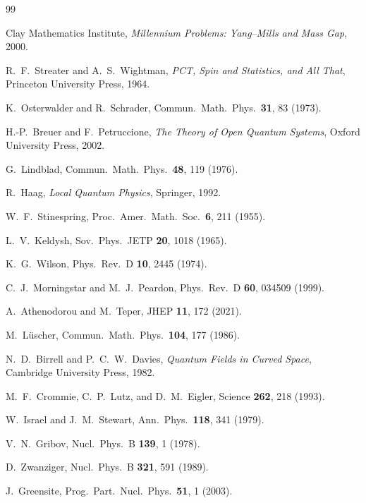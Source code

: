\documentclass[aps,prd,reprint,superscriptaddress,floatfix]{revtex4-2}
\theoremstyle{definition}
\begin{document}
\begin{thebibliography}{99}

  Clay Mathematics Institute, \textit{Millennium Problems: Yang--Mills and
  Mass Gap}, 2000.

  R.~F.~Streater and A.~S.~Wightman,
  \textit{PCT, Spin and Statistics, and All That},
  Princeton University Press, 1964.

  K.~Osterwalder and R.~Schrader,
  Commun.\ Math.\ Phys.\ \textbf{31}, 83 (1973).

  H.-P.~Breuer and F.~Petruccione,
  \textit{The Theory of Open Quantum Systems},
  Oxford University Press, 2002.

  G.~Lindblad,
  Commun.\ Math.\ Phys.\ \textbf{48}, 119 (1976).

  R.~Haag, \textit{Local Quantum Physics}, Springer, 1992.

  W.~F.~Stinespring,
  Proc.\ Amer.\ Math.\ Soc.\ \textbf{6}, 211 (1955).

  L.~V.~Keldysh,
  Sov.\ Phys.\ JETP \textbf{20}, 1018 (1965).

  K.~G.~Wilson,
  Phys.\ Rev.\ D \textbf{10}, 2445 (1974).

  C.~J.~Morningstar and M.~J.~Peardon,
  Phys.\ Rev.\ D \textbf{60}, 034509 (1999).

  A.~Athenodorou and M.~Teper,
  JHEP \textbf{11}, 172 (2021).

  M.~L\"uscher,
  Commun.\ Math.\ Phys.\ \textbf{104}, 177 (1986).

  N.~D.~Birrell and P.~C.~W.~Davies,
  \textit{Quantum Fields in Curved Space},
  Cambridge University Press, 1982.

  M.~F.~Crommie, C.~P.~Lutz, and D.~M.~Eigler,
  Science \textbf{262}, 218 (1993).

  W.~Israel and J.~M.~Stewart,
  Ann.\ Phys.\ \textbf{118}, 341 (1979).

  V.~N.~Gribov,
  Nucl.\ Phys.\ B \textbf{139}, 1 (1978).

  D.~Zwanziger,
  Nucl.\ Phys.\ B \textbf{321}, 591 (1989).

  J.~Greensite,
  Prog.\ Part.\ Nucl.\ Phys.\ \textbf{51}, 1 (2003).


\end{thebibliography}
\end{document}
